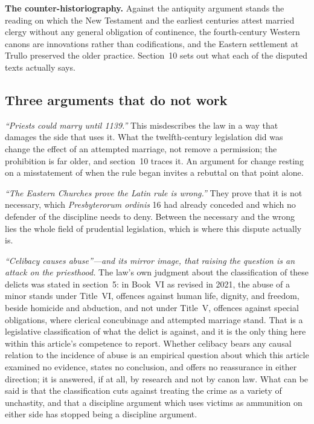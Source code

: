 \textbf{The counter-historiography.} Against the antiquity argument stands the reading on which the New Testament and the earliest centuries attest married clergy without any general obligation of continence, the fourth-century Western canons are innovations rather than codifications, and the Eastern settlement at Trullo preserved the older practice. Section~10 sets out what each of the disputed texts actually says.

\subsection{Three arguments that do not work}

\emph{``Priests could marry until 1139.''} This misdescribes the law in a way that damages the side that uses it. What the twelfth-century legislation did was change the effect of an attempted marriage, not remove a permission; the prohibition is far older, and section~10 traces it. An argument for change resting on a misstatement of when the rule began invites a rebuttal on that point alone.

\emph{``The Eastern Churches prove the Latin rule is wrong.''} They prove that it is not necessary, which \emph{Presbyterorum ordinis} 16 had already conceded and which no defender of the discipline needs to deny. Between the necessary and the wrong lies the whole field of prudential legislation, which is where this dispute actually is.

\emph{``Celibacy causes abuse''---and its mirror image, that raising the question is an attack on the priesthood.} The law's own judgment about the classification of these delicts was stated in section~5: in Book~VI as revised in 2021, the abuse of a minor stands under Title~VI, offences against human life, dignity, and freedom, beside homicide and abduction, and not under Title~V, offences against special obligations, where clerical concubinage and attempted marriage stand. That is a legislative classification of what the delict is against, and it is the only thing here within this article's competence to report. Whether celibacy bears any causal relation to the incidence of abuse is an empirical question about which this article examined no evidence, states no conclusion, and offers no reassurance in either direction; it is answered, if at all, by research and not by canon law. What can be said is that the classification cuts against treating the crime as a variety of unchastity, and that a discipline argument which uses victims as ammunition on either side has stopped being a discipline argument.

